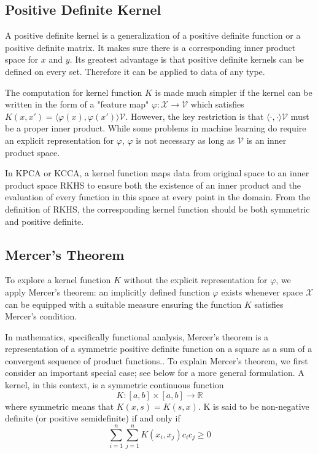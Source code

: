 \documentclass[12pt]{report} %
\begin{document}
\subsection{Positive Definite Kernel}
A positive definite kernel is a generalization of a positive definite function or a positive definite matrix. It makes sure there is a corresponding inner product space for $x$ and $y$. Its greatest advantage is that positive definite kernels can be defined on every set. Therefore it can be applied to data of any type.

The computation for kernel function $K$ is made much simpler if the kernel can be written in the form of a "feature map" $\varphi:\mathcal{X}\to\mathcal{V}$ which satisfies $K(x,x')=\langle \varphi (x), \varphi (x') \rangle \mathcal{V}$. However, the key restriction is that $\langle \cdot, \cdot \rangle \mathcal{V}$ must be a proper inner product. While some problems in machine learning do require an explicit representation for $\varphi$, $\varphi$ is not necessary as long as $\mathcal{V}$ is an inner product space\cite{PD}.

In KPCA or KCCA, a kernel function maps data from original space to an inner product space RKHS to ensure both the existence of an inner product and the evaluation of every function in this space at every point in the domain. From the definition of RKHS, the corresponding kernel function should be both symmetric and positive definite\cite{RKHS}.

\subsection{Mercer's Theorem}
To explore a kernel function $K$ without the explicit representation for $\varphi$, we apply Mercer's theorem: an implicitly defined function $\varphi$ exists whenever space $\mathcal {X}$ can be equipped with a suitable measure ensuring the function $K$ satisfies Mercer's condition.

In mathematics, specifically functional analysis, Mercer's theorem is a representation of a symmetric positive definite function on a square as a sum of a convergent sequence of product functions.\cite{MT}. To explain Mercer's theorem, we first consider an important special case; see below for a more general formulation. A kernel, in this context, is a symmetric continuous function
\begin{equation}
K:[a,b] \times [a,b] \rightarrow \mathbb {R}
\end{equation}
where symmetric means that \( K(x, s) = K(s, x)\).
K is said to be non-negative definite (or positive semidefinite) if and only if
\begin{equation}
\sum _{i=1}^{n}\sum _{j=1}^{n}K(x_{i},x_{j})c_{i}c_{j}\geq 0
\end{equation}
\end{document}

